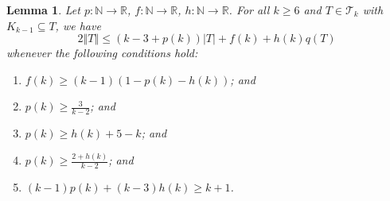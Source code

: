 \documentclass[12pt]{article}
\theoremstyle{plain}
\newtheorem{lem}[thm]{Lemma}
\theoremstyle{definition}
\theoremstyle{remark}
\newcommand{\fancy}[1]{\mathcal{#1}}
\newcommand{\IN}{\mathbb{N}}
\newcommand{\IR}{\mathbb{R}}
\newcommand{\T}{\fancy{T}}
\newcommand{\card}[1]{\left|#1\right|}
\newcommand{\size}[1]{\left\Vert#1\right\Vert}
\newcommand{\func}[3]{#1\colon #2 \rightarrow #3}
\begin{document}
\begin{lem}\label{BoundFamilyWithKKMinusOne}
	Let $\func{p}{\IN}{\IR}$, $\func{f}{\IN}{\IR}$, $\func{h}{\IN}{\IR}$. 
	For all $k \ge 6$ and $T \in \T_k$ with $K_{k-1} \subseteq T$, we have
	\[2\size{T} \le (k-3 + p(k))\card{T} + f(k) + h(k)q(T)\]
	whenever the following conditions hold:
	\begin{enumerate}
		\item $f(k) \ge (k-1)(1- p(k) - h(k))$; and	
	    \item $p(k) \ge \frac{3}{k-2}$; and
		\item $p(k) \ge h(k) + 5 - k$; and
		\item $p(k) \ge \frac{2+h(k)}{k-2}$; and
		\item $(k-1)p(k) + (k-3)h(k) \ge k+1$.
	\end{enumerate}
	
\end{lem}
\end{document}
